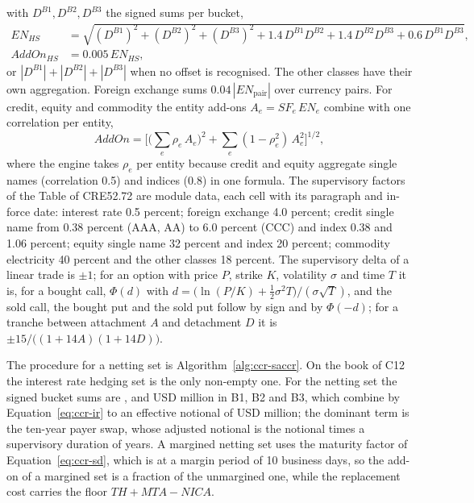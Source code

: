 with $D^{B1},D^{B2},D^{B3}$ the signed sums per bucket,
\begin{equation}
\begin{aligned}
EN_{HS}&=\sqrt{(D^{B1})^2+(D^{B2})^2+(D^{B3})^2+1.4\,D^{B1}D^{B2}+1.4\,D^{B2}D^{B3}+0.6\,D^{B1}D^{B3}},\\
AddOn_{HS}&=0.005\,EN_{HS},
\end{aligned}
\label{eq:ccr-ir}
\end{equation}
or $|D^{B1}|+|D^{B2}|+|D^{B3}|$ when no offset is recognised. The other classes have their own aggregation. Foreign exchange sums $0.04\,|EN_{\text{pair}}|$ over currency pairs. For credit, equity and commodity the entity add-ons $A_e=SF_e\,EN_e$ combine with one correlation per entity,
\begin{equation}
AddOn=\Big[\Big(\sum_e\rho_e\,A_e\Big)^2+\sum_e(1-\rho_e^2)\,A_e^2\Big]^{1/2},
\label{eq:ccr-entity}
\end{equation}
where the engine takes $\rho_e$ per entity because credit and equity aggregate single names (correlation 0.5) and indices (0.8) in one formula. The supervisory factors of the Table of CRE52.72 are module data, each cell with its paragraph and in-force date: interest rate 0.5 percent; foreign exchange 4.0 percent; credit single name from 0.38 percent (AAA, AA) to
6.0 percent (CCC) and index 0.38 and 1.06 percent; equity single name 32 percent and index 20 percent; commodity electricity 40 percent and the other classes 18 percent. The supervisory delta of a linear trade is $\pm1$; for an option with price $P$, strike $K$, volatility $\sigma$ and time $T$ it is, for a bought call, $\Phi(d)$ with $d=\big(\ln(P/K)+\tfrac12\sigma^2T\big)/(\sigma\sqrt T)$,
and the sold call, the bought put and the sold put follow by sign and by $\Phi(-d)$; for a tranche between attachment $A$ and detachment $D$ it is $\pm15/\big((1+14A)(1+14D)\big)$.

The procedure for a netting set is Algorithm~\ref{alg:ccr-saccr}. On the book of C12 the interest rate hedging set is the only non-empty one. For the netting set the signed bucket sums are \ccrDOneNetting{}, \ccrDTwoNetting{} and \ccrDThreeNetting{} USD million in B1, B2 and B3, which combine by Equation~\ref{eq:ccr-ir} to an effective notional of \ccrENNetting{} USD million; the dominant term is the ten-year payer swap,
whose adjusted notional is the notional times a supervisory duration of \ccrSdTen{} years. A margined netting set uses the maturity factor of Equation~\ref{eq:ccr-sd}, which is \ccrMaturityFactorCsa{} at a margin period of 10 business days, so the add-on of a margined set is a fraction of the unmargined one, while the replacement cost carries the floor $TH+MTA-NICA$.

